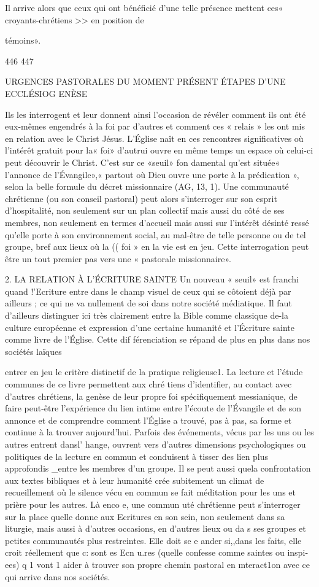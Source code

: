 Il arrive alors que ceux qui ont bénéficié d'une telle présence mettent ces« croyants-chrétiens >> en position de {{ témoins».
 

446	447
 
URGENCES PASTORALES DU MOMENT PRÉSENT	ÉTAPES D'UNE ECCLÉSIOG ENÈSE

 
Ils les interrogent et leur donnent ainsi l'occasion de révéler comment ils ont été eux-mêmes engendrés à la foi par d'autres et comment ces « relais » les ont mis en relation avec le Christ Jésus. L'Église naît en ces rencontres significatives où l'intérêt gratuit pour la« foi» d'autrui ouvre en même temps un espace où celui-ci peut découvrir le Christ. C'est sur ce «seuil» fon­ damental qu'est située« l'annonce de l'Évangile»,« partout où Dieu ouvre une porte à la prédication », selon la belle formule du décret missionnaire (AG, 13, 1).
Une communauté chrétienne (ou son conseil pastoral) peut
alors s'interroger sur son esprit d'hospitalité, non seulement sur un plan collectif mais aussi du côté de ses membres, non seulement en termes d'accueil mais aussi sur l'intérêt désinté­ ressé qu'elle porte à son environnement social, au mal-être de telle personne ou de tel groupe, bref aux lieux où la (( foi » en la vie est en jeu. Cette interrogation peut être un tout premier pas vers une « pastorale missionnaire».

2.	LA RELATION À L'ÉCRITURE SAINTE
Un nouveau « seuil» est franchi quand !'Ecriture entre dans le champ visuel de ceux qui se côtoient déjà par ailleurs ; ce qui ne va nullement de soi dans notre société médiatique. Il faut d'ailleurs distinguer ici très clairement entre la Bible comme classique de-la culture européenne et expression d'une certaine humanité et l'Écriture sainte comme livre de l'Église. Cette dif­ férenciation se répand de plus en plus dans nos sociétés laïques
 
entrer en jeu le critère distinctif de la pratique religieuse1. La lecture et l'étude communes de ce livre permettent aux chré­ tiens d'identifier, au contact avec d'autres chrétiens, la genèse de leur propre foi spécifiquement messianique, de faire peut-être l'expérience du lien intime entre l'écoute de l'Évangile et de son annonce et de comprendre comment l'Église a trouvé, pas à pas, sa forme et continue à la trouver aujourd'hui.
Parfois des événements, vécus par les uns ou les autres entrent dansl' hange, ouvrent vers d'autres dimensions psychologiques ou politiques de la lecture en commun et conduisent à tisser des lien plus approfondis _entre les membres d'un groupe. Il se peut aussi quela confrontation aux textes bibliques et à leur humanité crée subitement un climat de recueillement où le silence vécu en commun se fait méditation pour les uns et prière pour les autres.
Là enco e, une commun uté chrétienne peut s'interroger sur la place quelle donne aux Ecritures en son sein, non seulement dans sa liturgie, mais aussi à d'autres occasions, en d'autres lieux ou da s ses groupes et petites communautés plus restreintes. Elle doit se e ander si,,dans les faits, elle croit réellement que c: sont es Ecn u.res (quelle confesse comme saintes ou inspi­ ees) q 1 vont 1 aider à trouver son propre chemin pastoral en mteract1on avec ce qui arrive dans nos sociétés.
 
}}
